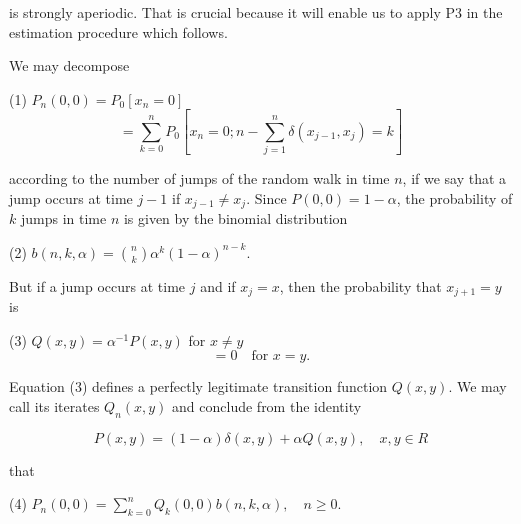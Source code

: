 is strongly aperiodic. That is crucial because it will enable us to apply P3 in the estimation procedure which follows.

We may decompose

(1) $P_n(0,0) = P_0[x_n = 0]$
$$= \sum_{k=0}^{n} P_0[x_n = 0; n - \sum_{j=1}^{n} \delta(x_{j-1}, x_j) = k]$$

according to the number of jumps of the random walk in time $n$, if we say that a jump occurs at time $j - 1$ if $x_{j-1} \neq x_j$. Since $P(0,0) = 1 - \alpha$, the probability of $k$ jumps in time $n$ is given by the binomial distribution

(2) $b(n,k,\alpha) = \binom{n}{k} \alpha^k (1 - \alpha)^{n-k}$.

But if a jump occurs at time $j$ and if $x_j = x$, then the probability that $x_{j+1} = y$ is

(3) $Q(x,y) = \alpha^{-1} P(x,y)$ for $x \neq y$
$$= 0 \quad \text{for } x = y.$$

Equation (3) defines a perfectly legitimate transition function $Q(x,y)$. We may call its iterates $Q_n(x,y)$ and conclude from the identity

$$P(x,y) = (1 - \alpha) \delta(x,y) + \alpha Q(x,y), \quad x,y \in R$$

that

(4) $P_n(0,0) = \sum_{k=0}^{n} Q_k(0,0)b(n,k,\alpha), \quad n \geq 0.$

